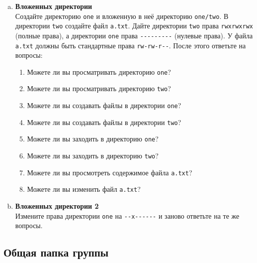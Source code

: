 \documentclass{article}
\begin{document}
\begin{enumerate}[a.]
\item \textbf{Вложенных директории}\\
Создайте директорию \texttt{one} и вложенную в неё директорию \texttt{one/two}. В директории \texttt{two} создайте файл \texttt{a.txt}. Дайте директории \texttt{two} права \texttt{rwxrwxrwx} (полные права), а директории \texttt{one} права \texttt{-{}-{}-{}-{}-{}-{}-{}-{}-} (нулевые права). У файла \texttt{a.txt} должны быть стандартные права \texttt{rw-rw-r-{}-}. После этого ответьте на вопросы:
\begin{enumerate}
\item Можете ли вы просматривать директорию \texttt{one}?
\item Можете ли вы просматривать директорию \texttt{two}?
\item Можете ли вы создавать файлы в директории \texttt{one}?
\item Можете ли вы создавать файлы в директории \texttt{two}?
\item Можете ли вы заходить в директорию \texttt{one}?
\item Можете ли вы заходить в директорию \texttt{two}?
\item Можете ли вы просмотреть содержимое файла \texttt{a.txt}?
\item Можете ли вы изменить файл \texttt{a.txt}?
\end{enumerate}

\item \textbf{Вложенных директории 2}\\
Измените права директории \texttt{one} на \texttt{-{}-x-{}-{}-{}-{}-{}-} и заново ответьте на те же вопросы.

\end{enumerate}



\subsection{Общая папка группы}
\end{document}
